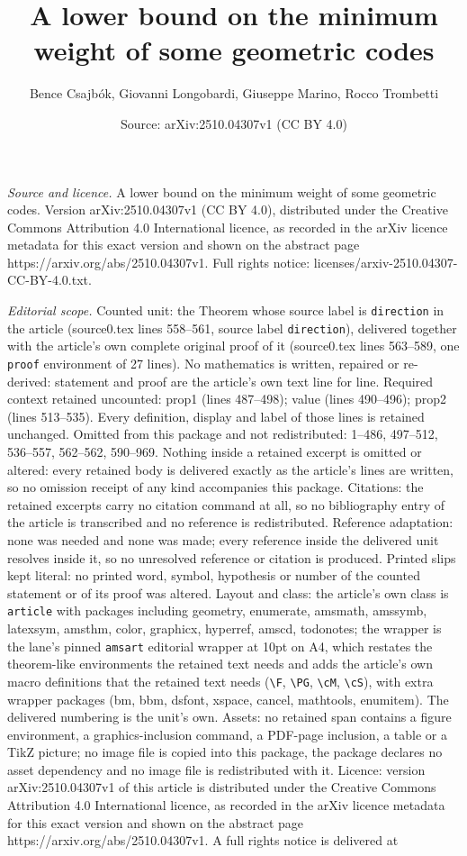 \documentclass[10pt,a4paper]{amsart}
\title[A lower bound on the minimum weight of some geometric codes]{A lower bound on the minimum weight of some geometric codes}
\author{Bence Csajb\'ok, Giovanni Longobardi, Giuseppe Marino, Rocco Trombetti}
\date{Source: arXiv:2510.04307v1 (CC BY 4.0)}
\begin{document}
\maketitle

\noindent\emph{Source and licence.} A lower bound on the minimum weight of some geometric codes. Version arXiv:2510.04307v1 (CC BY 4.0), distributed under the Creative Commons Attribution 4.0 International licence, as recorded in the arXiv licence metadata for this exact version and shown on the abstract page https://arxiv.org/abs/2510.04307v1. Full rights notice: licenses/arxiv-2510.04307-CC-BY-4.0.txt.\par\smallskip

\noindent\textit{Editorial scope.} Counted unit: the Theorem whose source label is \texttt{direction} in the article (source0.tex lines 558--561, source label \texttt{direction}), delivered together with the article's own complete original proof of it (source0.tex lines 563--589, one \texttt{proof} environment of 27 lines). No mathematics is written, repaired or re-derived: statement and proof are the article's own text line for line. Required context retained uncounted: prop1 (lines 487--498); value (lines 490--496); prop2 (lines 513--535). Every definition, display and label of those lines is retained unchanged. Omitted from this package and not redistributed: 1--486, 497--512, 536--557, 562--562, 590--969. Nothing inside a retained excerpt is omitted or altered: every retained body is delivered exactly as the article's lines are written, so no omission receipt of any kind accompanies this package. Citations: the retained excerpts carry no citation command at all, so no bibliography entry of the article is transcribed and no reference is redistributed. Reference adaptation: none was needed and none was made; every reference inside the delivered unit resolves inside it, so no unresolved reference or citation is produced. Printed slips kept literal: no printed word, symbol, hypothesis or number of the counted statement or of its proof was altered. Layout and class: the article's own class is \texttt{article} with packages including geometry, enumerate, amsmath, amssymb, latexsym, amsthm, color, graphicx, hyperref, amscd, todonotes; the wrapper is the lane's pinned \texttt{amsart} editorial wrapper at 10pt on A4, which restates the theorem-like environments the retained text needs and adds the article's own macro definitions that the retained text needs (\texttt{\textbackslash F}, \texttt{\textbackslash PG}, \texttt{\textbackslash cM}, \texttt{\textbackslash cS}), with extra wrapper packages (bm, bbm, dsfont, xspace, cancel, mathtools, enumitem). The delivered numbering is the unit's own. Assets: no retained span contains a figure environment, a graphics-inclusion command, a PDF-page inclusion, a table or a TikZ picture; no image file is copied into this package, the package declares no asset dependency and no image file is redistributed with it. Licence: version arXiv:2510.04307v1 of this article is distributed under the Creative Commons Attribution 4.0 International licence, as recorded in the arXiv licence metadata for this exact version and shown on the abstract page https://arxiv.org/abs/2510.04307v1. A full rights notice is delivered at 
\end{document}
